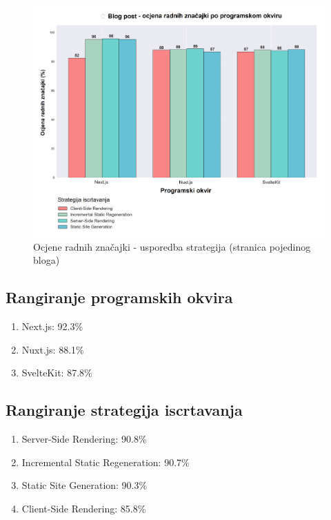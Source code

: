 \begin{figure}[H]
    \centering
    \includegraphics[width=\textwidth]{slike/rezultati/blog-post/blogPost_strategy_comparison.png}
    \caption{Ocjene radnih značajki - usporedba strategija (stranica pojedinog bloga) }
    \label{fig:testiranje-blog-post-usporedba-strategija}
\end{figure}

\newpage
\subsection{Rangiranje programskih okvira}
\begin{enumerate}
    \item Next.js: 92.3\%
    \item Nuxt.js: 88.1\%
    \item SvelteKit: 87.8\%
\end{enumerate}

\subsection{Rangiranje strategija iscrtavanja}
\begin{enumerate}
    \item Server-Side Rendering: 90.8\%
    \item Incremental Static Regeneration: 90.7\%
    \item Static Site Generation: 90.3\%
    \item Client-Side Rendering: 85.8\%
\end{enumerate}

